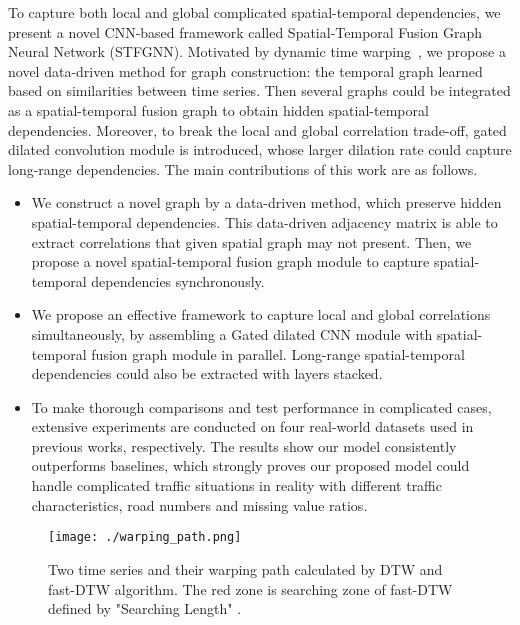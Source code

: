 \documentclass[letterpaper]{article} \usepackage{aaai21}  \usepackage{times}  \usepackage{helvet} \usepackage{courier}  \usepackage[hyphens]{url}  \usepackage{graphicx} \urlstyle{rm} \def\UrlFont{\rm}  \usepackage{natbib}  \usepackage{caption} \frenchspacing  \setlength{\pdfpagewidth}{8.5in}  \setlength{\pdfpageheight}{11in}  \usepackage{multirow}
\begin{document}
To capture both local and global complicated spatial-temporal dependencies, we present a novel CNN-based framework called Spatial-Temporal Fusion Graph Neural Network (STFGNN). Motivated by dynamic time warping~\cite{berndt1994using}, we propose a novel data-driven method for graph construction: the temporal graph learned based on similarities between time series. Then several graphs could be integrated as a spatial-temporal fusion graph to  obtain hidden spatial-temporal dependencies. Moreover, to break the local and global correlation trade-off, gated dilated convolution module is introduced, whose larger dilation rate could capture long-range dependencies. The main contributions of this work are as follows.

\begin{itemize}
\item We construct a novel graph by a data-driven method, which preserve hidden spatial-temporal dependencies. This data-driven adjacency matrix is able to extract correlations that given spatial graph may not present. Then, we propose a novel spatial-temporal fusion graph module to capture spatial-temporal dependencies synchronously. 

\item We propose an effective framework to capture local and global correlations simultaneously, by assembling a Gated dilated CNN module with spatial-temporal fusion graph module in parallel. Long-range spatial-temporal dependencies could also be extracted with layers stacked.

\item To make thorough comparisons and test performance in complicated cases, extensive experiments are conducted on four real-world datasets used in previous works, respectively. The results show our model consistently outperforms baselines, which strongly proves our proposed model could handle complicated traffic situations in reality with different traffic characteristics, road numbers and missing value ratios.
\end{itemize}





\begin{figure*}[!htb]
	\centering
	\texttt{[image: ./warping\_path.png]}
	\caption{Two time series and their warping path calculated by DTW and fast-DTW algorithm. The red zone is searching zone of fast-DTW defined by "Searching Length" .}
	\label{fig:dtw}
\end{figure*}
\end{document}
